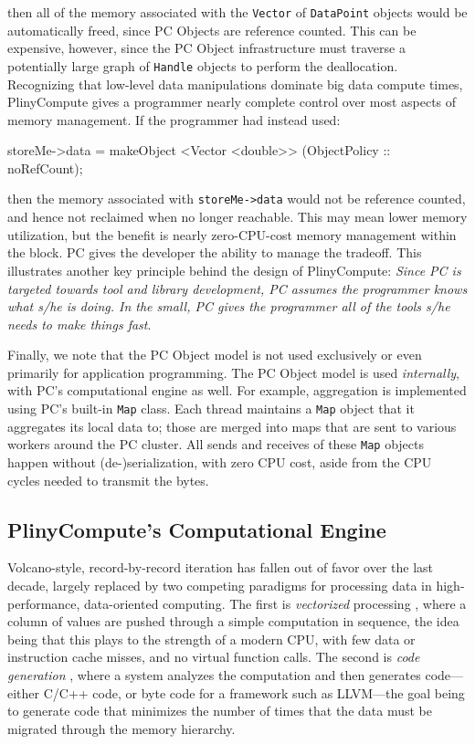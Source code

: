 \noindent then all of the memory associated with the \texttt{Vector} of \texttt{DataPoint} objects would be automatically
freed, since PC Objects are reference counted.  This can
be expensive, however, since the PC Object infrastructure must traverse a potentially large graph of \texttt{Handle} objects to perform the deallocation.  
Recognizing that low-level data manipulations dominate big data compute times, PlinyCompute gives a programmer nearly complete control over most aspects of memory management.
If the 
programmer had instead used: 

\begin{code}
storeMe->data = makeObject <Vector <double>> (ObjectPolicy :: noRefCount);
\end{code}

\noindent then the memory associated with \texttt{storeMe->data} would not be reference counted, and hence not reclaimed when no longer reachable.  
This may mean lower memory utilization,
but the benefit is nearly zero-CPU-cost memory management within the block.
PC gives the developer the ability to manage the tradeoff.
This illustrates another key principle behind the design of PlinyCompute: \emph{Since PC is targeted towards tool and library development, PC assumes the programmer
knows what s/he is doing.  In the small, PC gives the programmer all of the tools s/he needs to make things fast}.

Finally, we note that the PC Object model is not used exclusively or even primarily for application programming.  The PC Object model
is used \emph{internally}, with PC's computational engine as well.  For example, aggregation is implemented using PC's built-in \texttt{Map} class.  Each thread maintains
a \texttt{Map} object that it aggregates its local data to; those are merged into maps that are sent to various workers around the PC cluster.  All sends and
receives of these \texttt{Map} objects happen without (de-)serialization, with zero CPU cost, aside from the CPU cycles needed to transmit the bytes.

\subsection{PlinyCompute's Computational Engine}

Volcano-style, record-by-record iteration \cite{} has fallen out of favor over the last decade, largely replaced by
two competing paradigms for processing data
in high-performance, data-oriented computing.  The first is \emph{vectorized} processing \cite{}, where a column of values are pushed
through a simple computation in sequence, the idea being that this plays to the strength of a modern CPU, with few data or instruction cache misses, and no virtual
function calls.  The second is \emph{code generation} \cite{}, where a system analyzes the computation
and then generates code---either C/C++ code, or byte code for a framework such as LLVM---the goal being to generate code
that minimizes the number of times that the data must be migrated through the memory hierarchy.

